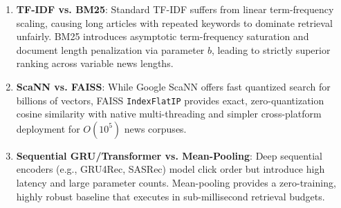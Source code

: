 \documentclass[10pt,twocolumn]{article}
\begin{document}
\begin{enumerate}
    \item \textbf{TF-IDF vs. BM25}: Standard TF-IDF suffers from linear term-frequency scaling, causing long articles with repeated keywords to dominate retrieval unfairly. BM25 introduces asymptotic term-frequency saturation and document length penalization via parameter $b$, leading to strictly superior ranking across variable news lengths.
    \item \textbf{ScaNN vs. FAISS}: While Google ScaNN offers fast quantized search for billions of vectors, FAISS \texttt{IndexFlatIP} provides exact, zero-quantization cosine similarity with native multi-threading and simpler cross-platform deployment for $O(10^5)$ news corpuses.
    \item \textbf{Sequential GRU/Transformer vs. Mean-Pooling}: Deep sequential encoders (e.g., GRU4Rec, SASRec) model click order but introduce high latency and large parameter counts. Mean-pooling provides a zero-training, highly robust baseline that executes in sub-millisecond retrieval budgets.
\end{enumerate}

\begin{table}[t]
\centering
\small
\caption{Comprehensive Offline Evaluation Results on MIND and EB-NeRD Validation Slices (1,000 Bootstrap Resamples, 95\% CI).}
\label{tab:offline_results}
\end{table}
\end{document}
